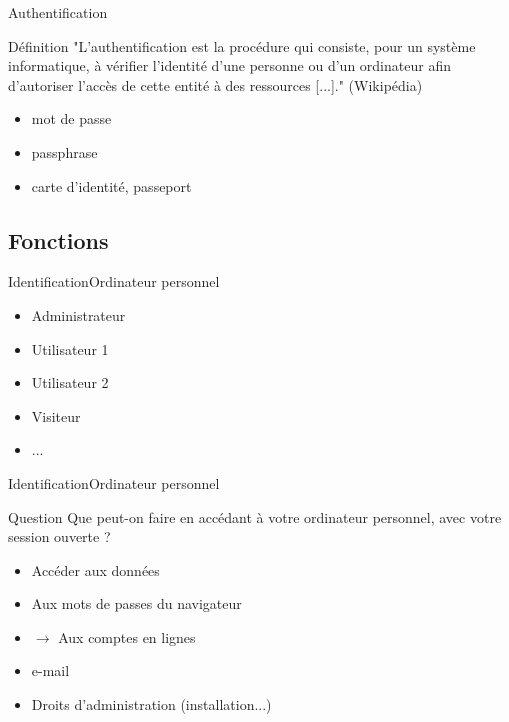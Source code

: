 \documentclass[12pt]{beamer}
\begin{document}
		\begin{frame}{Authentification}
			\onslide<1->
			\begin{exampleblock}{Définition}
				"L'\alert{authentification} est la procédure qui consiste, pour un système informatique, 
				à vérifier l'identité d'une personne ou d'un ordinateur afin d'autoriser l'accès de cette entité 
				à des ressources [...]." (Wikipédia)
			\end{exampleblock}
			\begin{itemize}
				\item mot de passe
				\item passphrase
				\item carte d'identité, passeport
			\end{itemize}
		\end{frame}
		
	\subsection{Fonctions}
		
		\begin{frame}{Identification}{Ordinateur personnel}
			\begin{itemize}
				\item Administrateur
				\item Utilisateur 1
				\item Utilisateur 2
				\item Visiteur
				\item ...
			\end{itemize}
		\end{frame}
		
		\begin{frame}{Identification}{Ordinateur personnel}
			\onslide<1->
			\begin{exampleblock}{Question}
				Que peut-on faire en accédant à votre ordinateur personnel, avec votre session ouverte ?
			\end{exampleblock}
			\begin{itemize}
				\item Accéder aux données
				\item Aux mots de passes du navigateur
				\item $\rightarrow$ Aux comptes en lignes
				\item e-mail
				\item Droits d'administration (installation...)
			\end{itemize}
		\end{frame}
		
\end{document}
